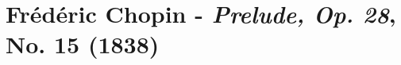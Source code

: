 \chapter[Chopin and Prelude, Op. 28, No. 15]{Frédéric Chopin - \textit{Prelude, Op. 28}, No. 15 (1838)}